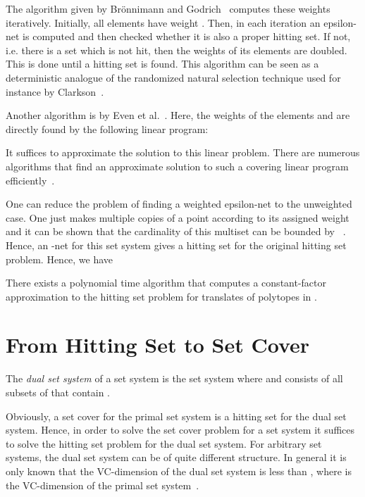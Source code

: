 \documentclass{stacs_proc}
\begin{document}
The algorithm given by Br\"{o}nnimann and Godrich~\cite{BG94} computes
these weights iteratively. Initially, all elements have weight
. Then, in each iteration an epsilon-net is computed and then
checked whether it is also a proper hitting set. If not, i.e. there is
a set which is not hit, then the weights of its elements are
doubled. This is done until a hitting set is found. This algorithm can
be seen as a deterministic analogue of the randomized natural
selection technique used for instance by Clarkson~\cite{C95}. 

Another algorithm is by Even et al.~\cite{ERS05}. Here, the weights of
the elements and  are directly found by the following linear
program: 
 

It suffices to approximate the solution to this linear problem. There
are numerous algorithms that find an approximate solution to such a
covering linear program efficiently~\cite{Y95, GK98}.

One can reduce the problem of finding a weighted epsilon-net to the
unweighted case. One just makes multiple copies of a point according
to its assigned weight and it can be shown that the cardinality of
this multiset can be bounded by ~\cite{CV05}. 
Hence, an -net for this set
system gives a hitting set for the original hitting set problem.
Hence, we have
\begin{theorem}
  There exists a polynomial time algorithm that computes a
  constant-factor approximation to the hitting set problem for
  translates of polytopes in . 
\end{theorem} 


\vskip-0.3cm
\section{From Hitting Set to Set Cover}

\begin{defi}
  The \emph{dual set system} of a set system  is the set
  system  where  and  consists of
  all subsets of  that contain . 
\end{defi}






Obviously, a set cover for the primal set system is a hitting set for
the dual set system. Hence, in order to solve the set cover problem
for a set system it suffices to solve the hitting set problem for the
dual set system. For arbitrary set systems, the dual set system can be
of quite different structure. In general it is only known that the
VC-dimension of the dual set system is less than , where 
is the VC-dimension of the primal set system~\cite{A83}.  
\end{document}

